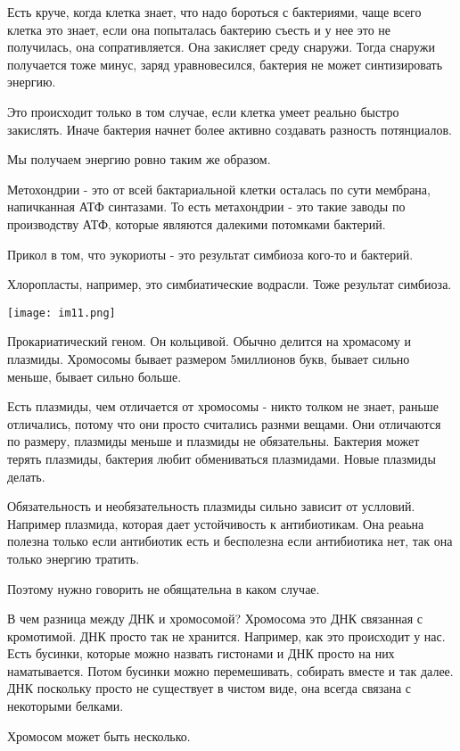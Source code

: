 Есть круче, когда клетка знает, что надо бороться с бактериями, чаще всего клетка это
знает, если она попыталась бактерию съесть и у нее это не получилась, она сопративляется.
Она закисляет среду снаружи. Тогда снаружи получается тоже минус, заряд
уравновесился, бактерия не может синтизировать энергию.

Это происходит только в том случае, если клетка умеет реально быстро закислять. Иначе бактерия
начнет более активно создавать разность потянциалов.

Мы получаем энергию ровно таким же образом.

Метохондрии - это от всей бактариальной клетки осталась по сути
мембрана, напичканная АТФ синтазами. То есть метахондрии -
это такие заводы по производству АТФ, которые являются далекими
потомками бактерий.

Прикол в том, что эукориоты - это результат
симбиоза кого-то и бактерий.

Хлоропласты, например, это симбиатические водрасли. Тоже
результат симбиоза.   

\texttt{[image: im11.png]}

Прокариатический геном. Он кольцивой. Обычно 
делится на хромасому и плазмиды. Хромосомы бывает размером 
5миллионов букв, бывает сильно меньше, 
бывает сильно больше. 

Есть плазмиды, чем отличается от хромосомы - никто толком не знает, 
раньше отличались, потому что они просто считались разнми вещами.
Они отличаются по размеру, плазмиды меньше и плазмиды не 
обязательны. Бактерия может терять плазмиды, бактерия любит 
обмениваться плазмидами. Новые плазмиды делать. 

Обязательность и необязательность плазмиды сильно зависит от услловий.
Например плазмида, которая дает
устойчивость к антибиотикам. Она реаьна полезна только
если антибиотик есть и бесполезна если антибиотика нет,
так она только энергию тратить.

Поэтому нужно говорить не обящательна в каком случае.

В чем разница между ДНК и хромосомой?
Хромосома это ДНК связанная с кромотимой. ДНК
просто так не хранится. Например,
как это происходит у нас. Есть бусинки,
которые можно назвать гистонами и ДНК просто на них
наматывается. Потом бусинки можно перемешивать,
собирать вместе и так далее. ДНК поскольку
просто не существует в чистом виде, она
всегда связана с некоторыми белками.

Хромосом может быть несколько.   

